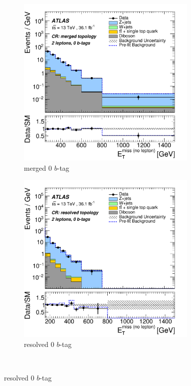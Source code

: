 \begin{figure}[htbp]
\centering
  \begin{subfigure}{0.45\textwidth}
    \centering
    \includegraphics[width=0.95\textwidth]{figures/monoV/results/figaux_09a.pdf}
    \caption{merged 0 \(b\)-tag}
  \end{subfigure}
  \begin{subfigure}{0.45\textwidth}
    \centering
    \includegraphics[width=0.95\textwidth]{figures/monoV/results/figaux_09b.pdf}
    \caption{resolved 0 \(b\)-tag}
  \end{subfigure} \\


\end{figure}
